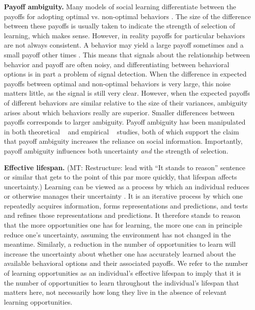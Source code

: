 \documentclass[letterpaper,11.5pt]{scrartcl}
\newcommand{\mt}[1]{{\textcolor{myorange} {({\tiny MT:} #1)}}}
\begin{document}
\textbf{Payoff ambiguity.}
Many models of social learning differentiate between the payoffs for adopting optimal vs. non-optimal behaviors \cite{Rogers1988,Enquist2007,Rendell2010}. The size of the difference between these payoffs is usually taken to indicate the strength of selection of learning, which makes sense. However, in reality payoffs for particular behaviors are not always consistent. A behavior may yield a large payoff sometimes and a small payoff other times \cite{McElreath2005}. This means that signals about the relationship between behavior and payoff are often noisy, and differentiating between behavioral options is in part a problem of signal detection.
When the difference in expected payoffs between optimal and non-optimal behaviors is very large, this noise matters little, as the signal is still very clear. However, when the expected payoffs of different behaviors are similar relative to the size of their variances, ambiguity arises about which behaviors really are superior. Smaller differences between payoffs corresponds to larger ambiguity. Payoff ambiguity has been manipulated in both theoretical ~\cite{perreault2012bayesian} and empirical ~\cite{McElreath2005, Morgan2012} studies, both of which support the claim that payoff ambiguity increases the reliance on social information. Importantly, payoff ambiguity %
influences both uncertainty \emph{and} the strength of selection. %

\textbf{Effective lifespan.}
\mt{Restructure: lead with ``It stands to reason'' sentence or similar that gets
to the point of this par more quickly, that lifespan affects uncertainty.}
Learning can be viewed as a process by which an individual reduces or otherwise manages their uncertainty \cite{jacobs2011bayesian,clark2013whatever}. It is an iterative process by which one repeatedly acquires information, forms representations and predictions, and tests and refines those representations and predictions. It therefore stands to reason that the more opportunities one has for learning, the more one can in principle reduce one's uncertainty, assuming the environment has not changed in the meantime. Similarly, a reduction in the number of opportunities to learn will increase the uncertainty about whether one has accurately learned about the available behavioral options and their associated payoffs. We refer to the number of learning opportunities as an individual's effective lifespan to imply that it is the number of opportunities to learn throughout the individual's lifespan that matters here, not necessarily how long they live in the absence of relevant learning opportunities.  
\end{document}
